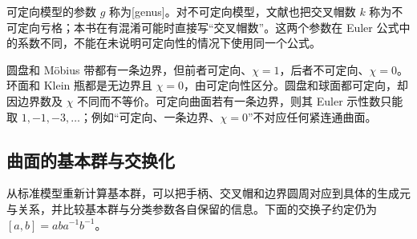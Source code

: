 可定向模型的参数 \(g\) 称为[genus]。对不可定向模型，文献也把交叉帽数 \(k\) 称为不可定向亏格；本书在有混淆可能时直接写“交叉帽数”。这两个参数在 Euler 公式中的系数不同，不能在未说明可定向性的情况下使用同一个公式。

\begin{example}\label{g1:exm:surface-invariants}
	圆盘和 Möbius 带都有一条边界，但前者可定向、\(\chi=1\)，后者不可定向、\(\chi=0\)。环面和 Klein 瓶都是无边界且 \(\chi=0\)，由可定向性区分。圆盘和球面都可定向，却因边界数及 \(\chi\) 不同而不等价。可定向曲面若有一条边界，则其 Euler 示性数只能取 \(1,-1,-3,\ldots\)；例如“可定向、一条边界、\(\chi=0\)”不对应任何紧连通曲面。
\end{example}

\subsection{曲面的基本群与交换化}
\label{g1:subsec:0605:04}

从标准模型重新计算基本群，可以把手柄、交叉帽和边界圆周对应到具体的生成元与关系，并比较基本群与分类参数各自保留的信息。下面的交换子约定仍为 \([a,b]=aba^{-1}b^{-1}\)。

